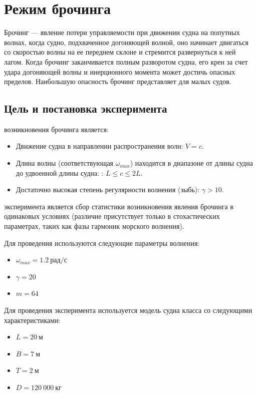 \section{Режим брочинга}

Брочинг --- явление потери управляемости при движении судна на попутных волнах, когда судно, подхваченное догоняющей волной, оно начинает двигаться со скоростью волны на ее переднем склоне и стремится развернуться к ней лагом. Когда брочинг заканчивается полным разворотом судна, его крен за счет удара догоняющей волны и инерционного момента может достичь опасных пределов. Наибольшую опасность брочинг представляет для малых судов.

\subsection{Цель и постановка эксперимента}

 возникновения брочинга является:
\begin{itemize}
	\item	Движение судна в направлении распространения волн: $V=c$.
	\item	Длина волны (соответствующая $\omega_{max}$) находится в диапазоне от длины судна до удвоенной длины судна:
			: $L \leqslant c \leqslant 2L$.
	\item	Достаточно высокая степень регулярности волнения (зыбь): $\gamma > 10$.
\end{itemize}

 эксперимента является сбор статистики возникновения явления брочинга в одинаковых условиях (различие присутствует только в стохастических параметрах, таких как фазы гармоник морского волнения).

Для проведения используются следующие параметры волнения:
\begin{itemize}
	\item	$\omega_{max} = 1.2\ \text{рад/с}$
	\item	$\gamma = 20$
	\item	$m = 64$
\end{itemize}

Для проведения эксперимента используется модель судна класса  со следующими характеристиками:
\begin{itemize}
	\item	$L = 20\ \text{м}$
	\item	$B = 7\ \text{м}$
	\item	$T = 2\ \text{м}$
	\item	$D = 120\ 000\ \text{кг}$
\end{itemize}

